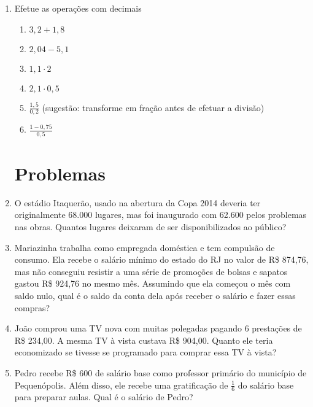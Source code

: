 \documentclass[a4paper]{article}
\begin{document}
\begin{enumerate}
\item Efetue as operações com decimais
  \begin{enumerate}
  \item $3,2 + 1,8$
  \item $2,04 - 5,1$
  \item $1,1 \cdot 2$
  \item $2,1 \cdot 0,5$
  \item $\frac{1,5}{0,2}$ (sugestão: transforme em fração antes de
    efetuar a divisão)
  \item $\frac{1 - 0,75}{0,5}$
  \end{enumerate}

\section{Problemas}

\item O estádio Itaquerão, usado na abertura da Copa 2014 deveria ter
  originalmente 68.000 lugares, mas foi inaugurado com 62.600 pelos
  problemas nas obras. Quantos lugares deixaram de ser
  disponibilizados ao público?

\item Mariazinha trabalha como empregada doméstica e tem compulsão de
  consumo. Ela recebe o salário mínimo do estado do RJ no valor de R\$
  874,76, mas não conseguiu resistir a uma série de promoções de
  bolsas e sapatos gastou R\$ 924,76 no mesmo mês. Assumindo que ela
  começou o mês com saldo nulo, qual é o saldo da conta dela após
  receber o salário e fazer essas compras?

\item João comprou uma TV nova com muitas polegadas pagando 6
  prestações de R\$ 234,00. A mesma TV à vista custava R\$
  904,00. Quanto ele teria economizado se tivesse se programado para
  comprar essa TV à vista?

\item Pedro recebe R\$ 600 de salário base como professor primário do
  município de Pequenópolis. Além disso, ele recebe uma gratificação
  de $\frac{1}{6}$ do salário base para preparar aulas. Qual é o
  salário de Pedro?
\end{enumerate}
\end{document}
